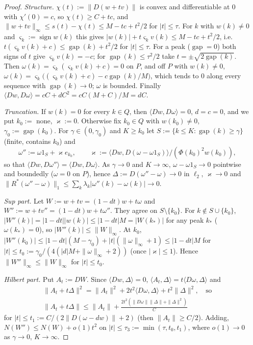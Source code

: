 \documentclass[10pt]{amsart}
\theoremstyle{definition}
\theoremstyle{remark}
\newcommand{\sgn}{\operatorname{sign}}
\newcommand{\gap}{\operatorname{gap}}
\newcommand{\ip}[2]{\langle #1,#2\rangle}
\begin{document}
\begin{proof}
\emph{Structure.}  $\chi(t):=\|D(w+tv)\|$ is convex and differentiable at
$0$ with $\chi'(0)=c$, so $\chi(t)\ge C+tc$, and $\|w+tv\|_\infty\le s(t)-
\chi(t)\le M-tc+t^2/2$ for $|t|\le\tau$.  For $k$ with $w(k)\neq0$ and
$\varsigma_k:=\sgn w(k)$ this gives
$|w(k)|+t\varsigma_kv(k)\le M-tc+t^2/2$, i.e.\
$t(\varsigma_kv(k)+c)\le\gap(k)+t^2/2$ for $|t|\le\tau$.  For a peak
($\gap=0$) both signs of $t$ give $\varsigma_kv(k)=-c$; for $\gap(k)\le
\tau^2/2$ take $t=\pm\sqrt{2\gap(k)}$.  Then $\omega(k)=\varsigma_k(\varsigma_k
v(k)+c)=0$ on $P$, and off $P$ with $w(k)\ne0$,
$\omega(k)=\varsigma_k\big((\varsigma_kv(k)+c)-c\gap(k)/M\big)$, which tends to
$0$ along every sequence with $\gap(k)\to0$; $\omega$ is bounded.
Finally $\ip{Dw}{D\omega}=cC+dC^2=cC(M+C)/M=dC$.

\emph{Truncation.}  If $w(k)=0$ for every $k\in Q$, then
$\ip{Dw}{D\omega}=0$, $d=c=0$, and we put $k_0:=$ none, $\varkappa:=0$.
Otherwise fix $k_0\in Q$ with $w(k_0)\neq0$, $\gamma_0:=\gap(k_0)$.  For
$\gamma\in(0,\gamma_0)$ and $K\ge k_0$ let $S:=\{k\le K:\gap(k)\ge\gamma\}$
(finite, contains $k_0$) and
\[
 \omega'':=\omega1_S+\varkappa e_{k_0},\qquad
 \varkappa:=\ip{Dw}{D(\omega-\omega1_S)}/(\Phi(k_0)^2w(k_0)),
\]
so that $\ip{Dw}{D\omega''}=\ip{Dw}{D\omega}$.  As $\gamma\to0$ and
$K\to\infty$, $\omega-\omega1_S\to0$ pointwise and boundedly ($\omega=0$ on
$P$), hence $\Delta:=D(\omega''-\omega)\to0$ in $\ell_2$, $\varkappa\to0$ and
$\|R^*(\omega''-\omega)\|_1\le\sum_k\lambda_k|\omega''(k)-\omega(k)|\to0$.

\emph{Sup part.}  Let $W:=w+tv=(1-dt)w+t\omega$ and
$W'':=w+tv''=(1-dt)w+t\omega''$.  They agree on $S\setminus\{k_0\}$.  For
$k\notin S\cup\{k_0\}$, $|W''(k)|=|1-dt||w(k)|\le|1-dt|M=|W(k_*)|$ for any
peak $k_*$ ($\omega(k_*)=0$), so $|W''(k)|\le\|W\|_\infty$.  At $k_0$,
$|W''(k_0)|\le|1-dt|(M-\gamma_0)+|t|(\|\omega\|_\infty+1)\le|1-dt|M$ for
$|t|\le t_0:=\gamma_0/(4(|d|M+\|\omega\|_\infty+2))$ (once $|\varkappa|\le1$).
Hence $\|W''\|_\infty\le\|W\|_\infty$ for $|t|\le t_0$.

\emph{Hilbert part.}  Put $A_t:=DW$.  Since $\ip{Dw}{\Delta}=0$,
$\ip{A_t}{\Delta}=t\ip{D\omega}{\Delta}$ and
\begin{gather*}
 \|A_t+t\Delta\|^2=\|A_t\|^2+2t^2\ip{D\omega}{\Delta}+t^2\|\Delta\|^2,
 \quad\text{so}\\
 \|A_t+t\Delta\|\le\|A_t\|+\frac{2t^2(\|D\omega\|\|\Delta\|+\|\Delta\|^2)}{C}
\end{gather*}
for $|t|\le t_1:=C/(2\|D(\omega-dw)\|+2)$ (then $\|A_t\|\ge C/2$).  Adding,
$N(W'')\le N(W)+o(1)t^2$ on $|t|\le\tau_3:=\min(\tau,t_0,t_1)$, where
$o(1)\to0$ as $\gamma\to0$, $K\to\infty$.
\end{proof}
\end{document}
